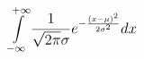 \documentclass[a4paper]{article}
\begin{document}
$$
\mathlarger{\int\limits_{-\infty}^{+\infty}{\frac{1}{\sqrt{2 \pi}\sigma }e^{-\frac{(x-\mu)^2}{2\sigma ^2}} dx}}
$$
\end{document}
